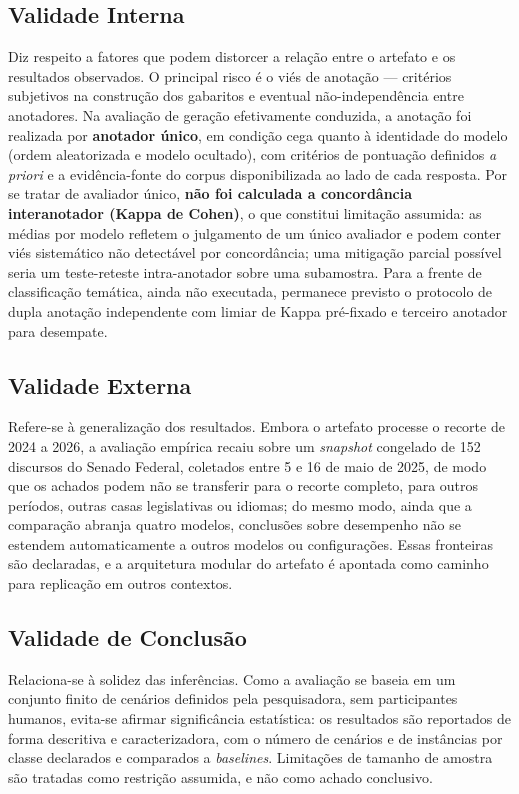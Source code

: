 \subsection{Validade Interna}
Diz respeito a fatores que podem distorcer a relação entre o artefato e os resultados observados. O principal risco é o viés de anotação --- critérios subjetivos na construção dos gabaritos e eventual não-independência entre anotadores. Na avaliação de geração efetivamente conduzida, a anotação foi realizada por \textbf{anotador único}, em condição cega quanto à identidade do modelo (ordem aleatorizada e modelo ocultado), com critérios de pontuação definidos \textit{a priori} e a evidência-fonte do corpus disponibilizada ao lado de cada resposta. Por se tratar de avaliador único, \textbf{não foi calculada a concordância interanotador (Kappa de Cohen)}, o que constitui limitação assumida: as médias por modelo refletem o julgamento de um único avaliador e podem conter viés sistemático não detectável por concordância; uma mitigação parcial possível seria um teste-reteste intra-anotador sobre uma subamostra. Para a frente de classificação temática, ainda não executada, permanece previsto o protocolo de dupla anotação independente com limiar de Kappa pré-fixado e terceiro anotador para desempate.

\subsection{Validade Externa}
Refere-se à generalização dos resultados. Embora o artefato processe o recorte de 2024 a 2026, a avaliação empírica recaiu sobre um \textit{snapshot} congelado de 152 discursos do Senado Federal, coletados entre 5 e 16 de maio de 2025, de modo que os achados podem não se transferir para o recorte completo, para outros períodos, outras casas legislativas ou idiomas; do mesmo modo, ainda que a comparação abranja quatro modelos, conclusões sobre desempenho não se estendem automaticamente a outros modelos ou configurações. Essas fronteiras são declaradas, e a arquitetura modular do artefato é apontada como caminho para replicação em outros contextos.

\subsection{Validade de Conclusão}
Relaciona-se à solidez das inferências. Como a avaliação se baseia em um conjunto finito de cenários definidos pela pesquisadora, sem participantes humanos, evita-se afirmar significância estatística: os resultados são reportados de forma descritiva e caracterizadora, com o número de cenários e de instâncias por classe declarados e comparados a \textit{baselines}. Limitações de tamanho de amostra são tratadas como restrição assumida, e não como achado conclusivo.

